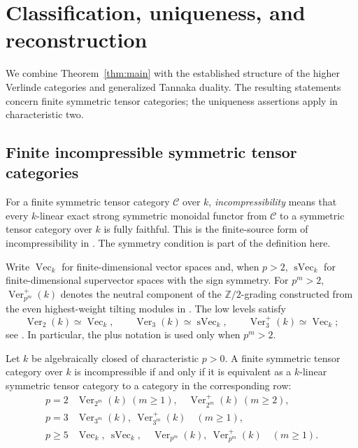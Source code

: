 \section{Classification, uniqueness, and reconstruction}
\label{sec:structural-consequences}

We combine Theorem~\ref{thm:main} with the established structure of the
higher Verlinde categories and generalized Tannaka duality. The resulting
statements concern finite symmetric tensor categories; the uniqueness
assertions apply in characteristic two.

\subsection{Finite incompressible symmetric tensor categories}

For a finite symmetric tensor category $\mathcal C$ over $k$,
\emph{incompressibility} means that every $k$-linear exact strong symmetric
monoidal functor from $\mathcal C$ to a symmetric tensor category over $k$
is fully faithful. This is the finite-source form of incompressibility in
\cite[Section~3.2]{CoulembierEtingofOstrikIncompressible}. The symmetry
condition is part of the definition here.

Write $\operatorname{Vec}_k$ for finite-dimensional vector spaces and,
when $p>2$, $\operatorname{sVec}_k$ for finite-dimensional supervector
spaces with the sign symmetry. For $p^m>2$,
$\operatorname{Ver}_{p^m}^+(k)$ denotes the neutral component of the
$\mathbb Z/2$-grading constructed from the even highest-weight tilting
modules in \cite[Section~4.1]{BEO2023}. The low levels satisfy
\[
 \operatorname{Ver}_2(k)\simeq\operatorname{Vec}_k,\qquad
 \operatorname{Ver}_3(k)\simeq\operatorname{sVec}_k,\qquad
 \operatorname{Ver}_3^+(k)\simeq\operatorname{Vec}_k;
\]
see \cite[Theorem~4.5(iii), Corollary~4.11, and Example~4.52]{BEO2023}.
In particular, the plus notation is used only when $p^m>2$.

\begin{corollary}
\label{cor:incompressible-classification}
Let $k$ be algebraically closed of characteristic $p>0$. A finite
symmetric tensor category over $k$ is incompressible if and only if it is
equivalent as a $k$-linear symmetric tensor category to a category in
the corresponding row:
\[
\begin{array}{c|l}
p=2&
 \operatorname{Ver}_{2^m}(k)\ (m\ge1),\quad
 \operatorname{Ver}_{2^m}^+(k)\ (m\ge2),\\[2pt]
p=3&
 \operatorname{Ver}_{3^m}(k),\
 \operatorname{Ver}_{3^m}^+(k)\quad(m\ge1),\\[2pt]
p\ge5&
 \operatorname{Vec}_k,\ \operatorname{sVec}_k,\quad
 \operatorname{Ver}_{p^m}(k),\
 \operatorname{Ver}_{p^m}^+(k)\quad(m\ge1).
\end{array}
\]
\end{corollary}

